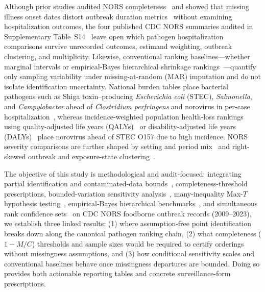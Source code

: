 Although prior studies audited NORS completeness~\cite{zhang2022evaluating} and showed that missing illness onset dates distort outbreak duration metrics~\cite{diemer2024missingness} without examining hospitalization outcomes, the four published CDC NORS summaries audited in Supplementary Table~S14~\cite{deweymattia2018surveillance,tack2021shiga,cdcsurveillance2019,wikswo2022enteric} leave open which pathogen hospitalization comparisons survive unrecorded outcomes, estimand weighting, outbreak clustering, and multiplicity. Likewise, conventional ranking baselines---whether marginal intervals or empirical-Bayes hierarchical shrinkage rankings~\cite{laird1989empirical,goldstein1996league,normand1997statistical}---quantify only sampling variability under missing-at-random (MAR) imputation and do not isolate identification uncertainty. National burden tables place bacterial pathogens such as Shiga toxin--producing \textit{Escherichia coli} (STEC), \textit{Salmonella}, and \textit{Campylobacter} ahead of \textit{Clostridium perfringens} and norovirus in per-case hospitalization~\cite{scallan2011foodborne,scallanwalter2025foodborne}, whereas incidence-weighted population health-loss rankings using quality-adjusted life years (QALYs)~\cite{batz2012ranking} or disability-adjusted life years (DALYs)~\cite{scallan2015assessment} place norovirus ahead of STEC O157 due to high incidence. NORS severity comparisons are further shaped by setting and period mix~\cite{burke2019norovirus,ray2021decreased,white2022foodborne} and right-skewed outbreak and exposure-state clustering~\cite{deweymattia2018surveillance}.

The objective of this study is methodological and audit-focused: integrating partial identification and contaminated-data bounds~\cite{manski1989anatomy,horowitz1995identification,horowitz2000nonparametric,molinari2008partial,arpino2014using,cole2019nonparametric,manski2021estimating}, completeness-threshold prescriptions, bounded-variation sensitivity analysis~\cite{keiding2014standardization,ratitch2013missing,kline2013sensitivity}, many-inequality Max-$T$ hypothesis testing~\cite{romano2005exact,romano2014practical,chernozhukov2019inference,kaido2019confidence}, empirical-Bayes hierarchical benchmarks~\cite{laird1989empirical}, and simultaneous rank confidence sets~\cite{klein2020joint,mogstad2024inference} on CDC NORS foodborne outbreak records (2009--2023), we establish three linked results: (1) where assumption-free point identification breaks down along the canonical pathogen ranking chain, (2) what completeness ($1 - M/C$) thresholds and sample sizes would be required to certify orderings without missingness assumptions, and (3) how conditional sensitivity scales and conventional baselines behave once missingness departures are bounded. Doing so provides both actionable reporting tables and concrete surveillance-form prescriptions.
